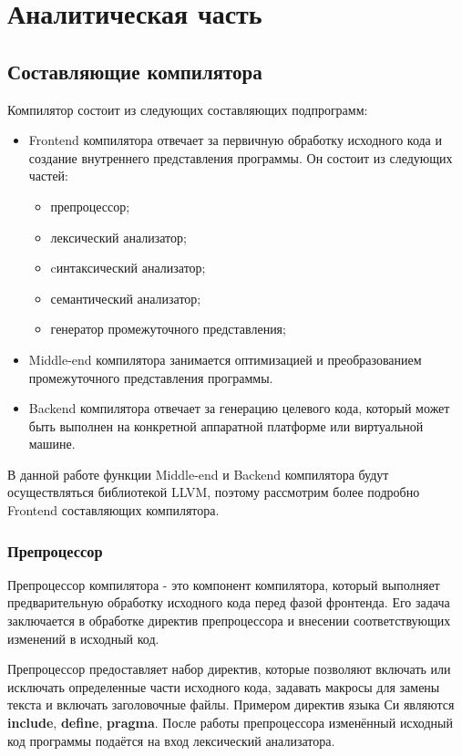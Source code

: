 \setcounter{section}{0}
\section{Аналитическая часть}

\subsection{Составляющие компилятора}
Компилятор состоит из следующих составляющих подпрограмм:
\begin{itemize}
    \item Frontend компилятора отвечает за первичную обработку исходного кода и создание внутреннего представления программы. Он состоит из следующих частей:
    \begin{itemize}
        \item препроцессор;
        \item лексический анализатор;
        \item cинтаксический анализатор;
        \item семантический анализатор;
        \item генератор промежуточного представления;
    \end{itemize}
    \item Middle-end компилятора занимается оптимизацией и преобразованием промежуточного представления программы.
    \item Backend компилятора отвечает за генерацию целевого кода, который может быть выполнен на конкретной аппаратной платформе или виртуальной машине.
\end{itemize}

В данной работе функции Middle-end и Backend компилятора будут осуществляться библиотекой LLVM, поэтому рассмотрим более подробно Frontend составляющих компилятора.


\subsubsection{Препроцессор}
Препроцессор компилятора - это компонент компилятора, который выполняет предварительную обработку исходного кода перед фазой фронтенда. Его задача заключается в обработке директив препроцессора и внесении соответствующих изменений в исходный код.

Препроцессор предоставляет набор директив, которые позволяют включать или исключать определенные части исходного кода, задавать макросы для замены текста и включать заголовочные файлы. Примером директив языка Си являются \textbf{include}, \textbf{define}, \textbf{pragma}. После работы препроцессора изменённый исходный код программы подаётся на вход лексический анализатора.

